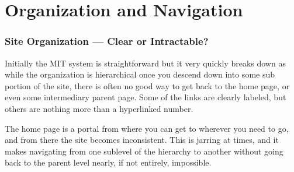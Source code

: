 \section*{Organization and Navigation}
\subsubsection*{Site Organization --- Clear or Intractable?}

Initially the MIT system is straightforward but it very quickly breaks down as while
the organization is hierarchical once you descend down into some sub portion of
the site, there is often no good way to get back to the home page, or even some
intermediary parent page. Some of the links are clearly labeled, but others are
nothing more than a hyperlinked number.

The home page is a portal from where you can get to wherever you need to go, and
from there the site becomes inconsistent. This is jarring at times, and it makes
navigating from one sublevel of the hierarchy to another without going back to the
parent level nearly, if not entirely, impossible.

